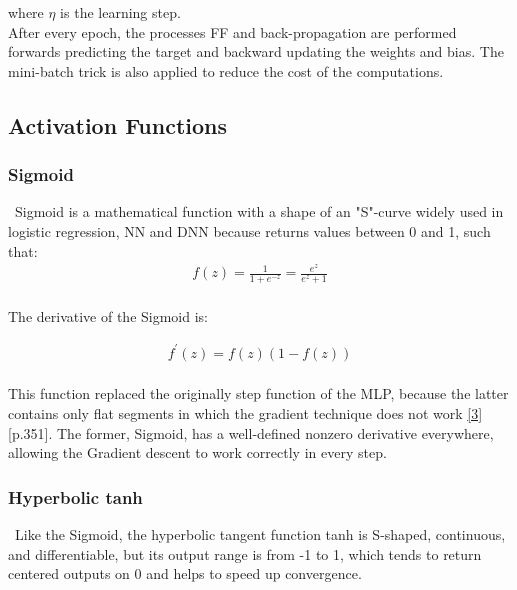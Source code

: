 \noindent where $\eta$ is the learning step.\\

After every epoch, the processes FF and back-propagation are performed forwards predicting the target and backward updating the weights and bias. The mini-batch trick is also applied to reduce the cost of the computations.\\

\subsection{Activation Functions}
\label{chap:Activation Functions}

\subsubsection{Sigmoid}
\label{chap:Sigmoid}

\qquad \, Sigmoid is a mathematical function with a shape of an "S"-curve widely used in logistic regression, NN and DNN because returns values between 0 and 1, such that:\\

\begin{align*}
f(z) = \frac{1}{1 + e^{-z}} = \frac{e^{z}}{e^{z}+1}
\end{align*}\\

The derivative of the Sigmoid is:

\begin{align*}
f^{'}(z) = f(z) (1 - f(z))
\end{align*}\\

This function replaced the originally step function of the MLP, because the latter contains only flat segments in which the gradient technique does not work \hyperref[Bib:Hands-on Machine Learning]{[3]}[p.351]. The former, Sigmoid, has a well-defined nonzero derivative everywhere, allowing the Gradient descent to work correctly in every step.\\

\subsubsection{Hyperbolic tanh}
\label{chap:Hyperbolic tanh}

\qquad \, Like the Sigmoid, the hyperbolic tangent function tanh is S-shaped, continuous, and differentiable, but its output range is from -1 to 1, which tends to return centered outputs on 0 and helps to speed up convergence.\\

